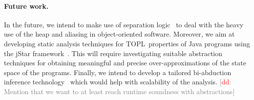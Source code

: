 \documentclass{llncs} %
\newcommand{\TPL}{TOPL}
\newcommand{\noterg}[2]{\textcolor{gray}{[\textcolor{red}{#1}: #2]}}
\newcommand{\dd}[1]{\noterg{dd}{#1}}
\newcommand{\dinocomment}[1]{\dd{#1}}
\begin{document}
\paragraph{Future work.}
In the future, we intend to make use of separation logic~\cite{reynolds2002} to deal with the heavy use of the heap and aliasing in object-oriented software. Moreover, we aim at developing static analysis techniques for \TPL \ properties of Java programs using the jStar framework~\cite{DBLP:conf/oopsla/DistefanoP08}.
This will require investigating suitable abstraction techniques for obtaining meaningful and precise over-approximations of the state space of the programs.
Finally, we intend to develop a tailored bi-abduction inference technology~\cite{dblp:conf/popl/CalcagnoDOY09} which would help with scalability of the analysis.
\dinocomment{Mention that we want to at least reach runtime soundness with abstractions}





\end{document}
